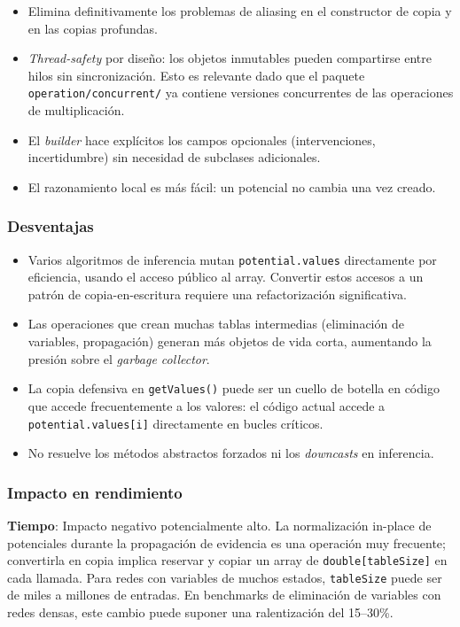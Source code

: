 \documentclass[11pt,a4paper]{article}
\newcommand{\code}[1]{\texttt{#1}}
\begin{document}
\begin{itemize}
  \item Elimina definitivamente los problemas de aliasing en el constructor de
        copia y en las copias profundas.
  \item \emph{Thread-safety} por diseño: los objetos inmutables pueden compartirse
        entre hilos sin sincronización.  Esto es relevante dado que el paquete
        \code{operation/concurrent/} ya contiene versiones concurrentes de las
        operaciones de multiplicación.
  \item El \emph{builder} hace explícitos los campos opcionales (intervenciones,
        incertidumbre) sin necesidad de subclases adicionales.
  \item El razonamiento local es más fácil: un potencial no cambia una vez
        creado.
\end{itemize}

\subsubsection*{Desventajas}

\begin{itemize}
  \item Varios algoritmos de inferencia mutan \code{potential.values} directamente
        por eficiencia, usando el acceso público al array.  Convertir estos
        accesos a un patrón de copia-en-escritura requiere una refactorización
        significativa.
  \item Las operaciones que crean muchas tablas intermedias (eliminación de
        variables, propagación) generan más objetos de vida corta, aumentando
        la presión sobre el \emph{garbage collector}.
  \item La copia defensiva en \code{getValues()} puede ser un cuello de botella en
        código que accede frecuentemente a los valores: el código actual accede
        a \code{potential.values[i]} directamente en bucles críticos.
  \item No resuelve los métodos abstractos forzados ni los \emph{downcasts} en
        inferencia.
\end{itemize}

\subsubsection*{Impacto en rendimiento}

\textbf{Tiempo}: Impacto negativo potencialmente alto.  La normalización in-place
de potenciales durante la propagación de evidencia es una operación muy
frecuente; convertirla en copia implica reservar y copiar un array de
\code{double[tableSize]} en cada llamada.  Para redes con variables de muchos
estados, \code{tableSize} puede ser de miles a millones de entradas.  En
benchmarks de eliminación de variables con redes densas, este cambio puede
suponer una ralentización del 15--30\%.
\end{document}
